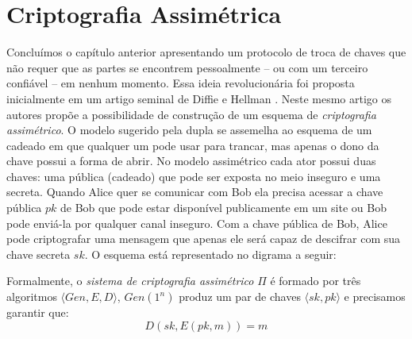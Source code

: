 \chapter{Criptografia Assimétrica}
\label{cha:criptografia-assimetrica}

Concluímos o capítulo anterior apresentando um protocolo de troca de chaves que não requer que as partes se encontrem pessoalmente -- ou com um terceiro confiável -- em nenhum momento.
Essa ideia revolucionária foi proposta inicialmente em um artigo seminal de Diffie e Hellman \cite{Diffie76}.
Neste mesmo artigo os autores propõe a possibilidade de construção de um esquema de {\em criptografia assimétrico}.
O modelo sugerido pela dupla se assemelha ao esquema de um cadeado em que qualquer um pode usar para trancar, mas apenas o dono da chave possui a forma de abrir.
No modelo assimétrico cada ator possui duas chaves: uma pública (cadeado) que pode ser exposta no meio inseguro e uma secreta.
Quando Alice quer se comunicar com Bob ela precisa acessar a chave pública $pk$ de Bob que pode estar disponível publicamente em um site ou Bob pode enviá-la por qualquer canal inseguro.
Com a chave pública de Bob, Alice pode criptografar uma mensagem que apenas ele será capaz de descifrar com sua chave secreta $sk$.
O esquema está representado no digrama a seguir:

\begin{center}
\end{center}

Formalmente, o {\em sistema de criptografia assimétrico} $\Pi$ é formado por três algoritmos $\langle Gen, E, D \rangle$, $Gen(1^n)$ produz um par de chaves $\langle sk, pk \rangle$ e precisamos garantir que:
\begin{displaymath}
  D(sk, E(pk, m)) = m
\end{displaymath}

